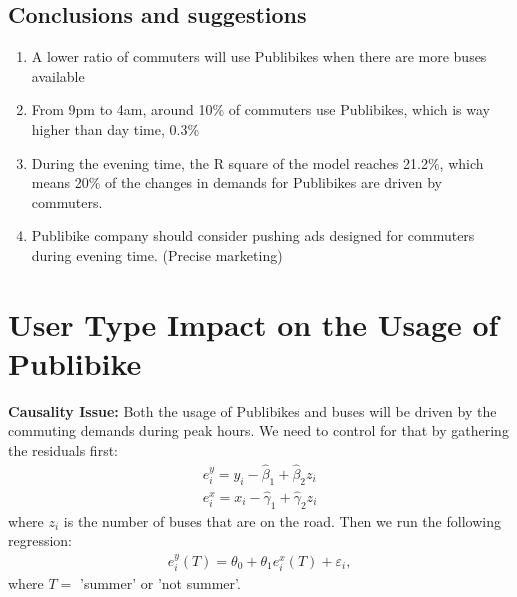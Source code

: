 \documentclass{article}
\begin{document}
\subsection{Conclusions and suggestions}
\begin{enumerate}
    \item A lower ratio of commuters will use Publibikes when there are more buses available
    \item From 9pm to 4am, around 10\% of commuters use Publibikes, which is way higher than day time, 0.3\%
    \item During the evening time, the R square of the model reaches 21.2\%, which means 20\% of the changes in demands for Publibikes are driven by commuters.
    \item Publibike company should consider pushing ads designed for commuters  during evening time. (Precise marketing)
\end{enumerate}

\newpage

\section{User Type Impact on the Usage of Publibike}
\textbf{Causality Issue: } Both the usage of Publibikes and buses will be driven by the commuting demands during peak hours. We need to control for that by gathering the residuals first:
\begin{align}
    e_i^y = y_i - \hat{\beta}_1 + \hat{\beta}_2 z_i\\
    e_i^x = x_i - \hat{\gamma}_1 + \hat{\gamma}_2 z_i
\end{align}
where $z_i$ is the number of buses that are on the road. Then we run the following regression:
\begin{align}
    e_i^y(T) = \theta_0 + \theta_1 e_i^x(T) + \varepsilon_i,
\end{align}
where $T =$ 'summer' or 'not summer'.
\end{document}
